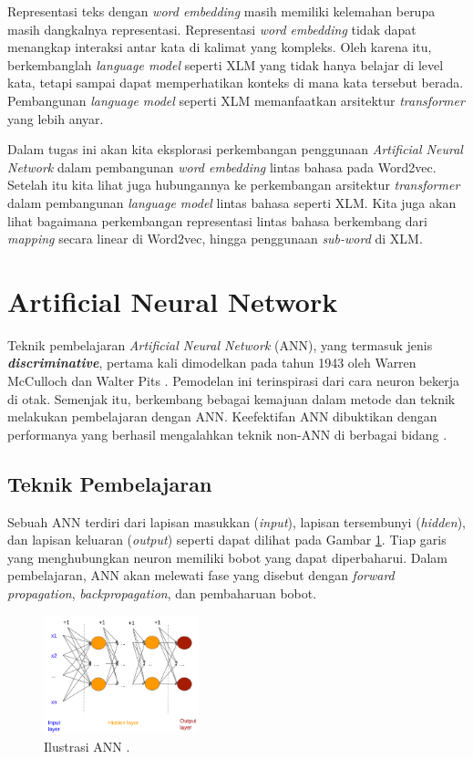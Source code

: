 \documentclass[conference]{IEEEtran}
\begin{document}
Representasi teks dengan \textit{word embedding} masih memiliki kelemahan berupa masih dangkalnya representasi. Representasi \textit{word embedding} tidak dapat menangkap interaksi antar kata di kalimat yang kompleks. Oleh karena itu, berkembanglah \textit{language model} seperti XLM \cite{b2} yang tidak hanya belajar di level kata, tetapi sampai dapat memperhatikan konteks di mana kata tersebut berada. Pembangunan \textit{language model} seperti XLM memanfaatkan arsitektur \textit{transformer} yang lebih anyar.
 
Dalam tugas ini akan kita eksplorasi perkembangan penggunaan \textit{Artificial Neural Network} dalam pembangunan \textit{word embedding} lintas bahasa pada Word2vec. Setelah itu kita lihat juga hubungannya ke perkembangan arsitektur \textit{transformer} dalam pembangunan \textit{language model} lintas bahasa seperti XLM. Kita juga akan lihat bagaimana perkembangan representasi lintas bahasa berkembang dari \textit{mapping} secara linear di Word2vec, hingga penggunaan \textit{sub-word} di XLM.

\section{Artificial Neural Network}
Teknik pembelajaran \textit{Artificial Neural Network} (ANN), yang termasuk jenis \textbf{\textit{discriminative}}, pertama kali dimodelkan pada tahun 1943 oleh Warren McCulloch dan Walter Pits \cite{b3}. Pemodelan ini terinspirasi dari cara neuron bekerja di otak. Semenjak itu, berkembang bebagai kemajuan dalam metode dan teknik melakukan pembelajaran dengan ANN. Keefektifan ANN dibuktikan dengan performanya yang berhasil mengalahkan teknik non-ANN di berbagai bidang \cite{b4} \cite{b5}.
	\subsection{Teknik Pembelajaran}
	Sebuah ANN terdiri dari lapisan masukkan (\textit{input}), lapisan tersembunyi (\textit{hidden}), dan lapisan keluaran (\textit{output}) seperti dapat dilihat pada Gambar \ref{fig:ilustrasi_ann}. Tiap garis yang menghubungkan neuron memiliki bobot yang dapat diperbaharui. Dalam pembelajaran, ANN akan melewati fase yang disebut dengan \textit{forward propagation}, \textit{backpropagation}, dan pembaharuan bobot.

	\begin{figure}[htbp]
	    \centerline{
	    \includegraphics[width=0.4\textwidth]{resources/ilustrasi_ann.png}
	    }
	    \caption{Ilustrasi ANN \cite{b6}.}
	    \label{fig:ilustrasi_ann}
	\end{figure}
\end{document}
